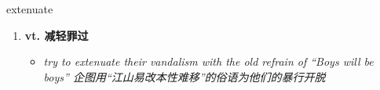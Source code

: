 
\begin{frame}
{\huge extenuate}
\begin{center}
\begin{enumerate}\Large
  \item \textbf{vt. 减轻罪过}
  \begin{itemize}
    \item \em{\Large{try to extenuate their vandalism with the old refrain of “Boys will be boys” 企图用“江山易改本性难移”的俗语为他们的暴行开脱}}
  \end{itemize}
\end{enumerate}
\end{center}
\end{frame}
